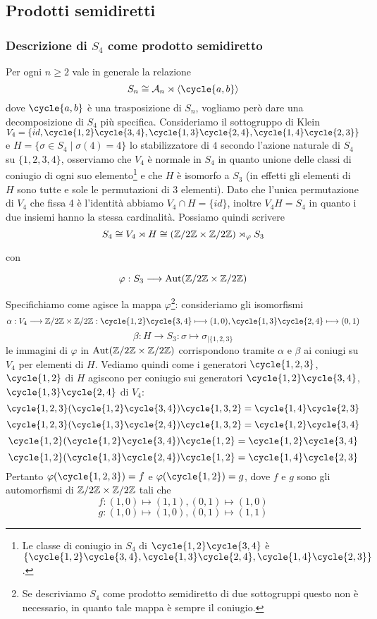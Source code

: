 \documentclass[11pt]{scrartcl}
\begin{document}
\newpage

\subsection{Prodotti semidiretti}

\subsubsection{Descrizione di $S_4$ come prodotto semidiretto}

Per ogni $n \geq 2$ vale in generale la relazione 
\[
    S_n \cong \mathcal{A}_n \rtimes \langle\cycle{a, b}\rangle
\]
dove $\cycle{a, b}$ è una trasposizione di $S_n$, vogliamo però dare una
decomposizione di $S_4$ più specifica. \newline
Consideriamo il sottogruppo di Klein $V_4 = \{id, \cycle{1, 2}\cycle{3, 4}, \cycle{1, 3}\cycle{2, 4},
\cycle{1, 4}\cycle{2, 3}\}$ e $H = \{\sigma \in S_4\mid \sigma(4) = 4\}$ lo 
stabilizzatore di $4$ secondo l'azione naturale di $S_4$ su $\{1, 2, 3, 4\}$,
osserviamo che $V_4$ è normale in $S_4$ in quanto
unione delle classi di coniugio di ogni suo elemento\footnote{
    Le classe di coniugio in $S_4$ di $\cycle{1, 2}\cycle{3, 4}$ è 
    $\{\cycle{1, 2}\cycle{3, 4}, \cycle{1, 3}\cycle{2, 4}, \cycle{1, 4}\cycle{2, 3}\}$.
}
e che $H$ è isomorfo a $S_3$ (in effetti gli elementi di $H$ sono tutte e 
sole le permutazioni di 3 elementi). Dato che l'unica permutazione di $V_4$
che fissa 4 è l'identità abbiamo $V_4 \cap H = \{id\}$, inoltre $V_4H = S_4$
in quanto i due insiemi hanno la stessa cardinalità. Possiamo quindi scrivere
\[
    S_4 \cong V_4 \rtimes H \cong (\mathbb{Z}/{2}\mathbb{Z} \times \mathbb{Z}/{2}\mathbb{Z}) \rtimes_{\varphi} S_3
\]

con

\[
    \varphi: S_3 \longrightarrow \operatorname{Aut}(\mathbb{Z}/{2}\mathbb{Z}\times\mathbb{Z}/{2}\mathbb{Z})
\]

Specifichiamo come agisce la mappa $\varphi$\footnote{Se descriviamo $S_4$ 
    come prodotto semidiretto di due sottogruppi questo non è 
    necessario, in quanto tale mappa è sempre il coniugio.
}:
consideriamo gli isomorfismi
\[
    \alpha: V_4\longrightarrow \Z2\times\Z2: \cycle{1, 2}\cycle{3, 4}\longmapsto (1, 0),
    \cycle{1, 3}\cycle{2, 4} \longmapsto (0, 1)
\]
\[
    \beta: H \longrightarrow S_3: \sigma \longmapsto \sigma_{\mid\{1, 2, 3\}}
\]
le immagini di $\varphi$ in $\operatorname{Aut}(\mathbb{Z}/{2}\mathbb{Z}\times\mathbb{Z}/{2}\mathbb{Z})$ corrispondono tramite $\alpha$
e $\beta$ ai coniugi su $V_4$ per elementi di $H$. Vediamo quindi come
i generatori $\cycle{1, 2, 3}$, $\cycle{1, 2}$ di $H$ agiscono per coniugio
sui generatori $\cycle{1, 2}\cycle{3, 4}$, $\cycle{1, 3}\cycle{2, 4}$ di $V_4$:
\[
    \cycle{1, 2, 3}(\cycle{1, 2}\cycle{3, 4})\cycle{1, 3, 2} = \cycle{1, 4}\cycle{2, 3}
\]
\[
    \cycle{1, 2, 3}(\cycle{1, 3}\cycle{2, 4})\cycle{1, 3, 2} = \cycle{1, 2}\cycle{3, 4}
\]
\[
    \cycle{1, 2}(\cycle{1, 2}\cycle{3, 4})\cycle{1, 2} = \cycle{1, 2}\cycle{3, 4}
\]
\[
    \cycle{1, 2}(\cycle{1, 3}\cycle{2, 4})\cycle{1, 2} = \cycle{1, 4}\cycle{2, 3}
\]
Pertanto $\varphi(\cycle{1, 2, 3}) = f$ e $\varphi(\cycle{1, 2}) = g$,
dove $f$ e $g$ sono gli automorfismi di $\mathbb{Z}/{2}\mathbb{Z}\times\mathbb{Z}/{2}\mathbb{Z}$ tali che
\[
    f: (1, 0)\longmapsto (1, 1), (0, 1) \longmapsto (1, 0)
\]
\[
    g: (1, 0)\longmapsto (1, 0), (0, 1) \longmapsto (1, 1)
\]
\end{document}
